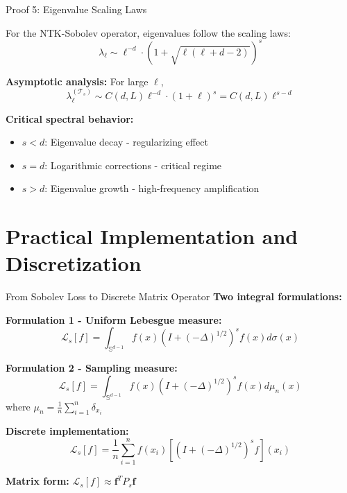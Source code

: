 \documentclass{beamer}
\begin{document}
\begin{frame}{Proof 5: Eigenvalue Scaling Laws}
\begin{theorem}
For the NTK-Sobolev operator, eigenvalues follow the scaling laws:
\[ \lambda_\ell \sim \ell^{-d} \cdot (1 + \sqrt{\ell(\ell + d - 2)})^s \]
\end{theorem}

\textbf{Asymptotic analysis:} For large $\ell$,
\[ \lambda_\ell^{(\mathcal{T}_s)} \sim C(d, L) \ell^{-d} \cdot (1 + \ell)^s = C(d, L) \ell^{s-d} \]

\textbf{Critical spectral behavior:}
\begin{itemize}
\item $s < d$: Eigenvalue decay - regularizing effect
\item $s = d$: Logarithmic corrections - critical regime
\item $s > d$: Eigenvalue growth - high-frequency amplification
\end{itemize}
\end{frame}

\section{Practical Implementation and Discretization}

\begin{frame}{From Sobolev Loss to Discrete Matrix Operator}
\textbf{Two integral formulations:}

\textbf{Formulation 1 - Uniform Lebesgue measure:}
\[ \mathcal{L}_s[f] = \int_{\mathbb{S}^{d-1}} f(x) (I + (-\Delta)^{1/2})^s f(x) d\sigma(x) \]

\textbf{Formulation 2 - Sampling measure:}
\[ \mathcal{L}_s[f] = \int_{\mathbb{S}^{d-1}} f(x) (I + (-\Delta)^{1/2})^s f(x) d\mu_n(x) \]
where $\mu_n = \frac{1}{n}\sum_{i=1}^n \delta_{x_i}$

\textbf{Discrete implementation:}
\[ \mathcal{L}_s[f] = \frac{1}{n}\sum_{i=1}^n f(x_i) \left[(I + (-\Delta)^{1/2})^s f\right](x_i) \]

\textbf{Matrix form:} $\mathcal{L}_s[f] \approx \mathbf{f}^T P_s \mathbf{f}$
\end{frame}
\end{document}
